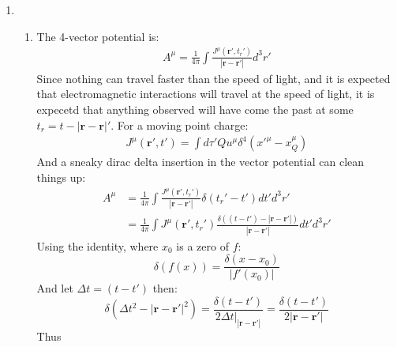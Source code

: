 \documentclass[12pt,a4]{article}
\begin{document}
\begin{enumerate}
  \item
    \begin{enumerate}
      \item
        The 4-vector potential is:
        \begin{gather*}
          A^\mu = \frac{1}{4 \pi}\int \frac{J^\mu (\mathbf{r}', t_r')}{|\mathbf{r} - \mathbf{r}'|} d^3r'
        \end{gather*}
        Since nothing can travel faster than the speed of light, and it is expected that electromagnetic interactions will travel at the speed of light, it is expecetd that anything observed will have come the past at some $t_r = t - |\mathbf{r} - \mathbf{r}|'$.
        For a moving point charge:
        \begin{gather*}
          J^\mu (\mathbf{r}', t') = \int d\tau' Q u^\mu \delta^4(x'^\mu - x_Q^\mu)
        \end{gather*}
        And a sneaky dirac delta insertion in the vector potential can clean things up:
        \begin{align*}
          A^\mu &= \frac{1}{4 \pi}\int \frac{J^\mu (\mathbf{r}', t_r')}{|\mathbf{r} - \mathbf{r}'|} \delta(t_r' - t')dt' d^3 r'\\
                &= \frac{1}{4 \pi}\int J^\mu (\mathbf{r}', t_r') \frac{\delta((t - t') - |\mathbf{r} - \mathbf{r}'|)}{|\mathbf{r} - \mathbf{r}'|}dt' d^3 r'
        \end{align*}
        Using the identity, where $x_0$ is a zero of $f$:
        \begin{equation}
          \delta(f(x)) = \frac{\delta(x - x_0)}{|f'(x_0)|}
          \label{eq:diracdeltafunction}
        \end{equation}
        And let $\Delta t = (t - t')$ then:
        \begin{equation*}
          \delta(\Delta t^2 - |\mathbf{r} - \mathbf{r}'|^2) = \frac{\delta(t - t')}{2 \Delta t |_{|\mathbf{r} - \mathbf{r}'|}} = \frac{\delta(t - t')}{2 |\mathbf{r} - \mathbf{r}'|}
        \end{equation*}
        Thus
        \begin{align*}

\end{align*}
\end{enumerate}
\end{enumerate}
\end{document}
